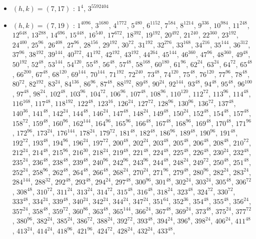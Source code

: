 \begin{itemize}
\item $(h,k)=(7,17)$ : $1^{4}$, $3^{5592404}$
\item $(h,k)=(7,19)$ : $1^{4096}$, $3^{1680}$, $4^{1772}$, $5^{480}$, $6^{1152}$, $7^{584}$, $8^{1214}$, $9^{336}$, $10^{984}$, $11^{248}$, $12^{648}$, $13^{288}$, $14^{696}$, $15^{448}$, $16^{540}$, $17^{672}$, $18^{392}$, $19^{192}$, $20^{492}$, $21^{240}$, $22^{360}$, $23^{192}$, $24^{400}$, $25^{96}$, $26^{408}$, $27^{96}$, $28^{156}$, $29^{192}$, $30^{72}$, $31^{192}$, $32^{276}$, $33^{168}$, $34^{216}$, $35^{144}$, $36^{312}$, $37^{96}$, $38^{192}$, $39^{144}$, $40^{372}$, $41^{192}$, $42^{192}$, $43^{192}$, $44^{264}$, $45^{144}$, $46^{360}$, $47^{96}$, $48^{360}$, $49^{48}$, $50^{192}$, $52^{48}$, $53^{144}$, $54^{120}$, $55^{48}$, $56^{48}$, $57^{48}$, $58^{168}$, $60^{180}$, $61^{96}$, $62^{24}$, $63^{24}$, $64^{72}$, $65^{48}$, $66^{200}$, $67^{48}$, $68^{120}$, $69^{144}$, $70^{144}$, $71^{192}$, $72^{240}$, $73^{48}$, $74^{120}$, $75^{48}$, $76^{120}$, $77^{96}$, $78^{48}$, $80^{72}$, $82^{192}$, $83^{24}$, $84^{136}$, $86^{96}$, $87^{48}$, $88^{192}$, $89^{48}$, $90^{24}$, $92^{144}$, $93^{48}$, $94^{48}$, $95^{48}$, $96^{100}$, $97^{48}$, $98^{24}$, $102^{48}$, $103^{96}$, $104^{72}$, $106^{96}$, $107^{48}$, $108^{96}$, $110^{120}$, $112^{72}$, $113^{96}$, $114^{48}$, $116^{168}$, $117^{48}$, $118^{192}$, $122^{48}$, $123^{16}$, $126^{24}$, $127^{72}$, $128^{96}$, $130^{96}$, $136^{72}$, $137^{48}$, $140^{36}$, $141^{48}$, $142^{24}$, $144^{48}$, $146^{24}$, $147^{48}$, $148^{24}$, $149^{48}$, $150^{24}$, $152^{48}$, $154^{48}$, $157^{48}$, $158^{72}$, $159^{48}$, $160^{96}$, $162^{144}$, $164^{96}$, $165^{96}$, $166^{48}$, $167^{48}$, $168^{96}$, $169^{48}$, $170^{48}$, $171^{96}$, $172^{96}$, $173^{24}$, $176^{144}$, $178^{24}$, $179^{72}$, $181^{48}$, $182^{48}$, $186^{96}$, $189^{48}$, $190^{96}$, $191^{48}$, $192^{72}$, $193^{48}$, $194^{96}$, $196^{24}$, $197^{72}$, $200^{48}$, $202^{24}$, $203^{48}$, $205^{48}$, $206^{48}$, $208^{48}$, $210^{72}$, $212^{24}$, $214^{48}$, $215^{96}$, $216^{30}$, $218^{24}$, $219^{48}$, $221^{48}$, $224^{48}$, $225^{48}$, $226^{48}$, $230^{24}$, $232^{48}$, $235^{24}$, $236^{48}$, $238^{48}$, $239^{48}$, $240^{96}$, $242^{96}$, $243^{96}$, $244^{48}$, $248^{24}$, $249^{72}$, $250^{48}$, $251^{48}$, $252^{24}$, $258^{96}$, $262^{48}$, $264^{48}$, $266^{48}$, $268^{24}$, $270^{24}$, $271^{96}$, $279^{48}$, $280^{96}$, $282^{24}$, $283^{24}$, $284^{144}$, $288^{32}$, $292^{48}$, $293^{48}$, $294^{24}$, $297^{48}$, $300^{96}$, $301^{48}$, $302^{24}$, $303^{24}$, $305^{48}$, $306^{72}$, $308^{48}$, $310^{72}$, $311^{24}$, $313^{24}$, $314^{72}$, $315^{48}$, $316^{48}$, $318^{24}$, $323^{48}$, $324^{72}$, $330^{72}$, $333^{48}$, $334^{24}$, $339^{48}$, $340^{24}$, $342^{24}$, $344^{24}$, $347^{24}$, $351^{64}$, $352^{36}$, $354^{48}$, $355^{48}$, $356^{24}$, $357^{24}$, $358^{48}$, $359^{72}$, $360^{86}$, $363^{48}$, $365^{144}$, $366^{24}$, $367^{48}$, $369^{24}$, $373^{48}$, $375^{24}$, $377^{72}$, $380^{96}$, $382^{24}$, $385^{24}$, $386^{72}$, $388^{24}$, $392^{72}$, $393^{48}$, $394^{24}$, $396^{8}$, $398^{24}$, $406^{24}$, $411^{48}$, $413^{24}$, $414^{24}$, $418^{96}$, $421^{96}$, $424^{72}$, $428^{24}$, $432^{24}$, $433^{48}$, 
\end{itemize}
